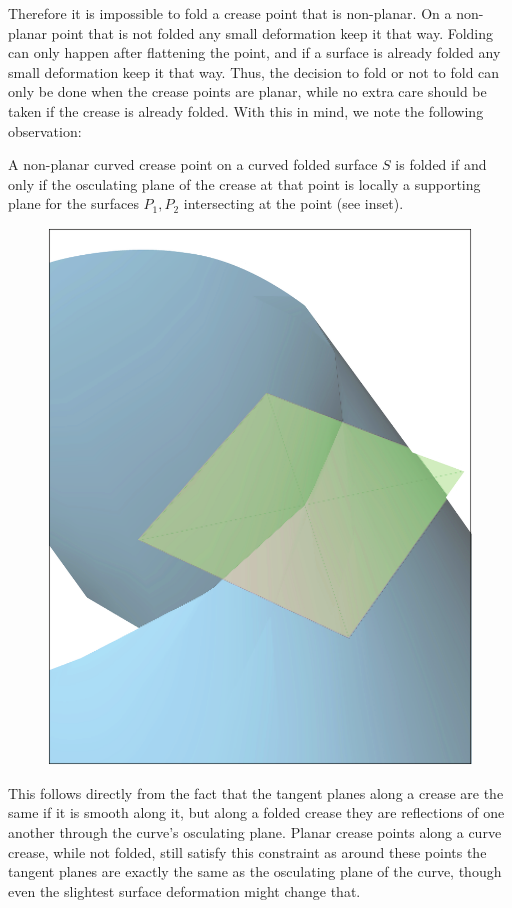 Therefore it is impossible to fold a crease point that is non-planar. On a non-planar point that is not folded any small deformation keep it that way. Folding can only happen after flattening the point, and if a surface is already folded any small deformation keep it that way. Thus, the decision to fold or not to fold can only be done when the crease points are planar, while no extra care should be taken if the crease is already folded. With this in mind, we note the following observation:

\begin{theorem}\label{Thm:supporting_plane}
A non-planar curved crease point on a curved folded surface $S$ is folded if and only if the osculating plane of the crease at that point is locally a supporting plane for the surfaces $P_1,P_2$ intersecting at the point (see inset).
\end{theorem}
\setlength{\columnsep}{8pt}%
\begin{figure}
  \centering
  \includegraphics[width=\linewidth]{figures/plane_side}
\end{figure}
This follows directly from the fact that the tangent planes along a crease are the same if it is smooth along it, but along a folded crease they are reflections of one another through the curve's osculating plane. Planar crease points along a curve crease, while not folded, still satisfy this constraint as around these points the tangent planes are exactly the same as the osculating plane of the curve, though even the slightest surface deformation might change that. 

